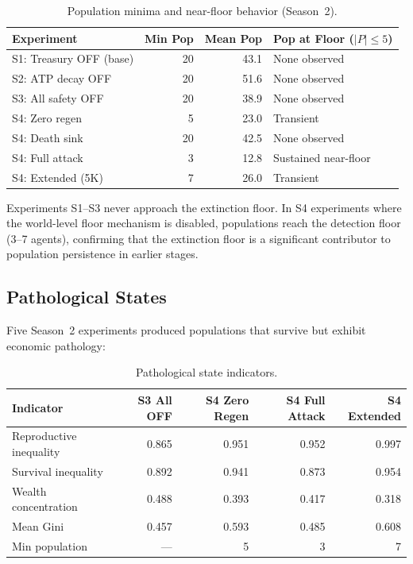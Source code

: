 \documentclass[11pt,a4paper]{article}
\begin{document}
\begin{table}[H]
\centering
\caption{Population minima and near-floor behavior (Season~2).}
\small
\begin{tabular}{@{}lrrl@{}}
\toprule
Experiment & Min Pop & Mean Pop & Pop at Floor ($|P| \leq 5$) \\
\midrule
S1: Treasury OFF (base) & 20 & 43.1 & None observed \\
S2: ATP decay OFF & 20 & 51.6 & None observed \\
S3: All safety OFF & 20 & 38.9 & None observed \\
S4: Zero regen & 5 & 23.0 & Transient \\
S4: Death sink & 20 & 42.5 & None observed \\
S4: Full attack & 3 & 12.8 & Sustained near-floor \\
S4: Extended (5K) & 7 & 26.0 & Transient \\
\bottomrule
\end{tabular}
\end{table}

Experiments S1--S3 never approach the extinction floor. In S4 experiments where the world-level floor mechanism is disabled, populations reach the detection floor (3--7 agents), confirming that the extinction floor is a significant contributor to population persistence in earlier stages.

\subsection{Pathological States}

Five Season~2 experiments produced populations that survive but exhibit economic pathology:

\begin{table}[H]
\centering
\caption{Pathological state indicators.}
\small
\begin{tabular}{@{}lrrrr@{}}
\toprule
Indicator & S3 All OFF & S4 Zero Regen & S4 Full Attack & S4 Extended \\
\midrule
Reproductive inequality & 0.865 & 0.951 & 0.952 & 0.997 \\
Survival inequality & 0.892 & 0.941 & 0.873 & 0.954 \\
Wealth concentration & 0.488 & 0.393 & 0.417 & 0.318 \\
Mean Gini & 0.457 & 0.593 & 0.485 & 0.608 \\
Min population & --- & 5 & 3 & 7 \\
\bottomrule
\end{tabular}
\end{table}
\end{document}
